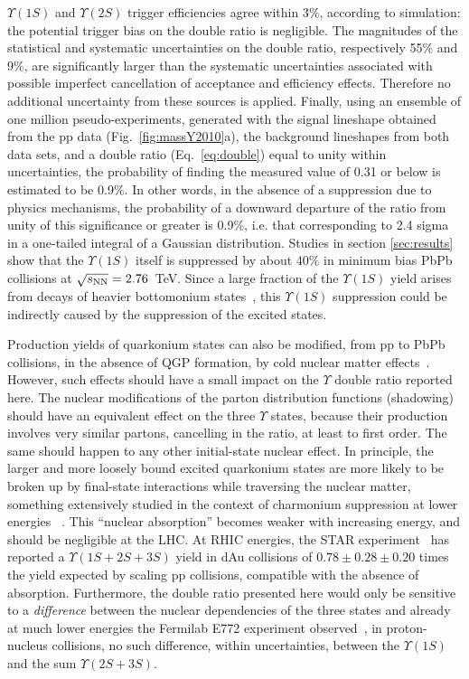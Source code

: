 $\Upsilon(1S)$ and $\Upsilon(2S)$ trigger efficiencies agree within 3$\%$, according to simulation: the potential trigger bias on the double ratio is negligible. 
The magnitudes of the statistical and systematic uncertainties on the double ratio, respectively 55$\%$ and 9$\%$, are significantly larger than the systematic 
uncertainties associated with possible imperfect cancellation of acceptance and efficiency effects. Therefore no additional uncertainty from these sources is applied.
Finally, using an ensemble of one million pseudo-experiments, generated with the signal lineshape obtained from the pp data (Fig.~\ref{fig:massY2010}a), the background 
lineshapes from both data sets, and a double ratio (Eq.~\ref{eq:double}) equal to unity within uncertainties, the probability of finding the measured value of 0.31 or 
below is estimated to be 0.9$\%$. In other words, in the absence of a suppression due to physics mechanisms, the probability of a downward departure of the ratio from 
unity of this significance or greater is 0.9$\%$, i.e. that corresponding to 2.4 sigma in a one-tailed integral of a Gaussian distribution.
Studies in section \ref{sec:results} show that the $\Upsilon(1S)$ itself is suppressed by about 40$\%$ in minimum bias PbPb collisions at 
$\sqrt{s_{\rm NN}} = 2.76$~TeV. Since a large fraction of the $\Upsilon(1S)$ yield arises from decays of heavier bottomonium states~\cite{Affolder:1999wm}, 
this $\Upsilon(1S)$ suppression could be indirectly caused by the suppression of the excited states.

Production yields of quarkonium states can also be modified, from pp to PbPb collisions, in the absence of QGP formation, by cold nuclear matter effects~\cite{Vogt:2010aa}. 
However, such effects should have a small impact on the $\Upsilon$ double ratio reported here. The nuclear modifications of the parton distribution functions (shadowing) 
should have an equivalent effect on the three $\Upsilon$ states, because their production involves very similar partons, cancelling in the ratio, at least to first order. 
The same should happen to any other initial-state nuclear effect. In principle, the larger and more loosely bound excited quarkonium states are more likely to be broken 
up by final-state interactions while traversing the nuclear matter, something extensively studied in the context of charmonium suppression at lower energies
~\cite{Lourenco:2008sk}. 
This ``nuclear absorption'' becomes weaker with increasing energy, and should be negligible at the LHC. At RHIC energies, the STAR experiment~\cite{Reed:2011zz} has reported 
a $\Upsilon(1S+2S+3S)$ yield in dAu collisions of $0.78 \pm 0.28 \pm 0.20$ times the yield expected by scaling pp collisions, compatible with the absence of absorption. 
Furthermore, the double ratio presented here would only be sensitive to a \emph{difference} between the nuclear dependencies of the three states and already at much lower energies 
the Fermilab E772 experiment observed~\cite{Alde:1991sw}, in proton-nucleus collisions, no such difference, within uncertainties, between the $\Upsilon(1S)$ and 
the sum $\Upsilon(2S+3S)$.





